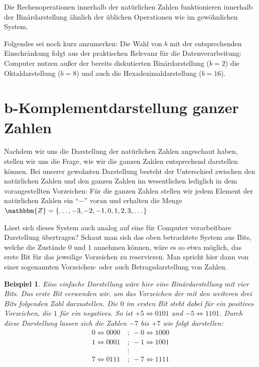 \documentclass{article}
\newcommand{\Z}{\mathbbm{Z}} %
\newtheorem{beispiel}[satz]{Beispiel}
\begin{document}
  Die Rechenoperationen innerhalb der natürlichen Zahlen funktionieren innerhalb der Binärdarstellung ähnlich der üblichen Operationen wie im gewöhnlichen System.

  \vspace{\baselineskip}

  Folgendes sei noch kurz anzumerken:
  Die Wahl von $b$ mit der entsprechenden Einschränkung folgt aus der praktischen Relevanz für die Datenverarbeitung:
  Computer nutzen außer der bereits diskutierten Binärdarstellung ($b=2$) die Oktaldarstellung ($b=8$) und auch die Hexadezimaldarstellung ($b=16$).

\newpage

\section{b-Komplementdarstellung ganzer Zahlen}

  Nachdem wir uns die Darstellung der natürlichen Zahlen angeschaut haben, stellen wir uns die Frage, wie wir die ganzen Zahlen entsprechend darstellen können.
  Bei unserer gewohnten Darstellung besteht der Unterschied zwischen den natürlichen Zahlen und den ganzen Zahlen im wesentlichen lediglich in dem vorangestellten Vorzeichen:
  Für die ganzen Zahlen stellen wir jedem Element der natürlichen Zahlen ein ``$-$'' voran und erhalten die Menge $\Z = \{\dots,-3, -2, -1, 0, 1,2,3,\dots\}$

  Lässt sich dieses System auch analog auf eine für Computer verarbeitbare Darstellung übertragen?
  Schaut man sich das oben betrachtete System aus Bits, welche die Zustände $0$ und $1$ annehmen können, wäre es so etwa möglich, das erste Bit für das jeweilige Vorzeichen zu reservieren.
  Man spricht hier dann von einer sogenannten Vorzeichen- oder auch Betragsdarstellung von Zahlen.

  \begin{beispiel} \label{bsp:Binärdarstellung_Vorzeichen}
    Eine einfache Darstellung wäre hier eine Binärdarstellung mit vier Bits.
    Das erste Bit verwenden wir, um das Vorzeichen der mit den weiteren drei Bits folgenden Zahl darzustellen.
    Die $0$ im ersten Bit steht dabei für ein positives Vorzeichen, die $1$ für ein negatives.
    So ist $+5 \Leftrightarrow 0101$ und $-5 \Leftrightarrow 1101$.
    Durch diese Darstellung lassen sich die Zahlen $-7$ bis $+7$ wie folgt darstellen:
    \begin{align*}
      0 \Leftrightarrow 0000  ~&;~  -0 \Leftrightarrow 1000 \\
      1 \Leftrightarrow 0001  ~&;~  -1 \Leftrightarrow 1001 \\
      & \vdots \\
      7 \Leftrightarrow 0111  ~&;~  -7 \Leftrightarrow 1111
    \end{align*}
  \end{beispiel}
  
\end{document}
